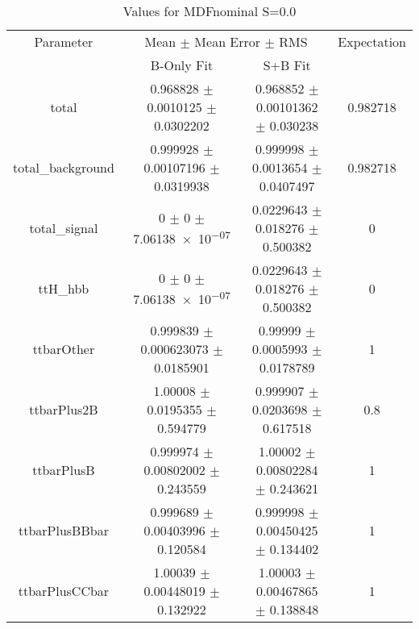\begin{table}
\centering
\caption{Values for MDFnominal S=0.0}
\begin{tabular}{cccc}
\toprule
Parameter & \multicolumn{2}{c}{Mean $\pm$ Mean Error $\pm$ RMS} & Expectation\\
 & B-Only Fit & S+B Fit & \\
\midrule
total & \num{0.968828} $\pm$ \num{0.0010125} $\pm$ \num{0.0302202} & \num{0.968852} $\pm$ \num{0.00101362} $\pm$ \num{0.030238} & \num{0.982718}\\
total\_background & \num{0.999928} $\pm$ \num{0.00107196} $\pm$ \num{0.0319938} & \num{0.999998} $\pm$ \num{0.0013654} $\pm$ \num{0.0407497} & \num{0.982718}\\
total\_signal & \num{0} $\pm$ \num{0} $\pm$ \num{7.06138e-07} & \num{0.0229643} $\pm$ \num{0.018276} $\pm$ \num{0.500382} & \num{0}\\
ttH\_hbb & \num{0} $\pm$ \num{0} $\pm$ \num{7.06138e-07} & \num{0.0229643} $\pm$ \num{0.018276} $\pm$ \num{0.500382} & \num{0}\\
ttbarOther & \num{0.999839} $\pm$ \num{0.000623073} $\pm$ \num{0.0185901} & \num{0.99999} $\pm$ \num{0.0005993} $\pm$ \num{0.0178789} & \num{1}\\
ttbarPlus2B & \num{1.00008} $\pm$ \num{0.0195355} $\pm$ \num{0.594779} & \num{0.999907} $\pm$ \num{0.0203698} $\pm$ \num{0.617518} & \num{0.8}\\
ttbarPlusB & \num{0.999974} $\pm$ \num{0.00802002} $\pm$ \num{0.243559} & \num{1.00002} $\pm$ \num{0.00802284} $\pm$ \num{0.243621} & \num{1}\\
ttbarPlusBBbar & \num{0.999689} $\pm$ \num{0.00403996} $\pm$ \num{0.120584} & \num{0.999998} $\pm$ \num{0.00450425} $\pm$ \num{0.134402} & \num{1}\\
ttbarPlusCCbar & \num{1.00039} $\pm$ \num{0.00448019} $\pm$ \num{0.132922} & \num{1.00003} $\pm$ \num{0.00467865} $\pm$ \num{0.138848} & \num{1}\\
\bottomrule
\end{tabular}
\end{table}